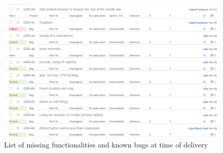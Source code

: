 \begin{figure}[ht!]
  \centering
  \includegraphics[width=\linewidth]{./FurtherWork/img/missingfunc}
  \caption{List of missing functionalities and known bugs at time of delivery}
  \label{fig:FurtherRequredLackingMissingFunc}
\end{figure}

